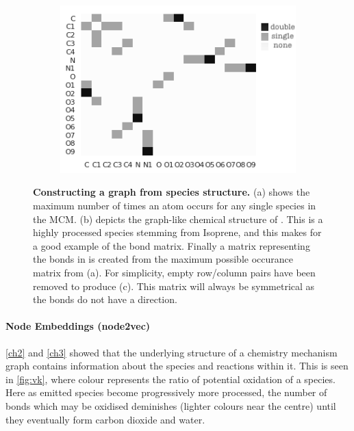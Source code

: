 \begin{figure}[H]
\begin{subfigure}[b]{0.325\textwidth}
         \includegraphics[width=\textwidth,height=.8\textwidth]{4fig/INB1NBCO3_adj.png}
          \caption{}
         \label{fig:adjmol}
     \end{subfigure}

        \caption{ \textbf{Constructing a graph from species structure.} 
        (a) shows the maximum number of times an atom occurs for any single species in the MCM. (b) depicts the graph-like chemical structure of . This is a highly processed species stemming from Isoprene, and this makes for a good example of the bond matrix. Finally a matrix representing the bonds in  is created from the maximum possible occurance matrix from (a). For simplicity, empty row/column pairs have been removed to produce (c). This matrix will always be symmetrical as the bonds do not have a direction.}
        \label{fig:bondmat}
\end{figure}


\paragraph{Node Embeddings (node2vec)}\label{sec:n2vec}
\autoref{ch2} and \autoref{ch3} showed that the underlying structure of a chemistry mechanism graph contains information about the species and reactions within it. This is seen in \autoref{fig:vk}, where colour represents the ratio of potential oxidation of a species. Here as emitted species become progressively more processed, the number of bonds which may be oxidised deminishes (lighter colours near the centre) until they eventually form carbon dioxide and water. 


